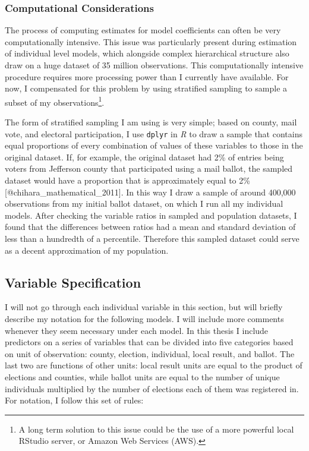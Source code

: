 \documentclass[]{article}
\let\rmarkdownfootnote\footnote%
\def\footnote{\protect\rmarkdownfootnote}
\begin{document}
\subsubsection{Computational
Considerations}\label{computational-considerations}

The process of computing estimates for model coefficients can often be
very computationally intensive. This issue was particularly present
during estimation of individual level models, which alongside complex
hierarchical structure also draw on a huge dataset of 35 million
observations. This computationally intensive procedure requires more
processing power than I currently have available. For now, I compensated
for this problem by using stratified sampling to sample a subset of my
observations\footnote{A long term solution to this issue could be the
  use of a more powerful local RStudio server, or Amazon Web Services
  (AWS).}.

The form of stratified sampling I am using is very simple; based on
county, mail vote, and electoral participation, I use \texttt{dplyr} in
\textit{R} to draw a sample that contains equal proportions of every
combination of values of these variables to those in the original
dataset. If, for example, the original dataset had 2\% of entries being
voters from Jefferson county that participated using a mail ballot, the
sampled dataset would have a proportion that is approximately equal to
2\% {[}@chihara\_mathematical\_2011{]}. In this way I draw a sample of
around 400,000 observations from my initial ballot dataset, on which I
run all my individual models. After checking the variable ratios in
sampled and population datasets, I found that the differences between
ratios had a mean and standard deviation of less than a hundredth of a
percentile. Therefore this sampled dataset could serve as a decent
approximation of my population.

\subsection{Variable Specification}\label{variable-specification}

I will not go through each individual variable in this section, but will
briefly describe my notation for the following models. I will include
more comments whenever they seem necessary under each model. In this
thesis I include predictors on a series of variables that can be divided
into five categories based on unit of observation: county, election,
individual, local result, and ballot. The last two are functions of
other units: local result units are equal to the product of elections
and counties, while ballot units are equal to the number of unique
individuals multiplied by the number of elections each of them was
registered in. For notation, I follow this set of rules:
\end{document}

